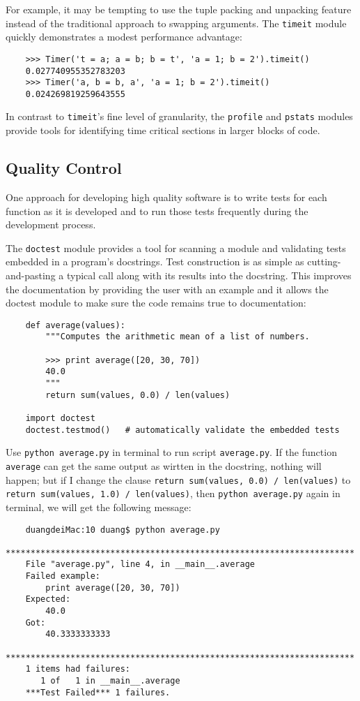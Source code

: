 \documentclass[UTF8]{article}
\begin{document}
For example, it may be tempting to use the tuple packing and unpacking feature instead of the
traditional approach to swapping arguments. The \texttt{timeit} module quickly demonstrates a
modest performance advantage:
\begin{verbatim}
    >>> Timer('t = a; a = b; b = t', 'a = 1; b = 2').timeit()
    0.027740955352783203
    >>> Timer('a, b = b, a', 'a = 1; b = 2').timeit()
    0.024269819259643555
\end{verbatim}

In contrast to \texttt{timeit}'s fine level of granularity, the \texttt{profile} and \texttt{pstats}
modules provide tools for identifying time critical sections in larger blocks of code.

\subsection{Quality Control}
One approach for developing high quality software is to write tests for each function as it is
developed and to run those tests frequently during the development process.

The \texttt{doctest} module provides a tool for scanning a module and validating tests embedded in
a program's docstrings. Test construction is as simple as cutting-and-pasting a typical call along
with its results into the docstring. This improves the documentation by providing the user with an
example and it allows the doctest module to make sure the code remains true to documentation:
\begin{verbatim}
    def average(values):
        """Computes the arithmetic mean of a list of numbers.

        >>> print average([20, 30, 70])
        40.0
        """
        return sum(values, 0.0) / len(values)

    import doctest
    doctest.testmod()   # automatically validate the embedded tests
\end{verbatim}

Use \texttt{python average.py} in terminal to run script \texttt{average.py}. If the function
\texttt{average} can get the same output as wirtten in the docstring, nothing will happen; but if I
change the clause \texttt{return sum(values, 0.0) / len(values)} to
\texttt{return sum(values, 1.0) / len(values)}, then \texttt{python average.py} again
in terminal, we will get the following message:
\begin{verbatim}
    duangdeiMac:10 duang$ python average.py
    **********************************************************************
    File "average.py", line 4, in __main__.average
    Failed example:
        print average([20, 30, 70])
    Expected:
        40.0
    Got:
        40.3333333333
    **********************************************************************
    1 items had failures:
       1 of   1 in __main__.average
    ***Test Failed*** 1 failures.
\end{verbatim}
\end{document}
